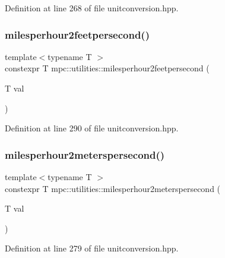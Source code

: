 Definition at line 268 of file unitconversion.\+hpp.

\mbox{\label{namespacempc_1_1utilities_aeca95aa677140f98a53ae3b5033ea892}} 
\subsubsection{\texorpdfstring{milesperhour2feetpersecond()}{milesperhour2feetpersecond()}}
{\footnotesize\ttfamily template$<$typename T $>$ \\
constexpr T mpc\+::utilities\+::milesperhour2feetpersecond (\begin{DoxyParamCaption}\item[{T}]{val }\end{DoxyParamCaption})}



Definition at line 290 of file unitconversion.\+hpp.

\mbox{\label{namespacempc_1_1utilities_ab14e5cdfd57941629a121328c7971cc3}} 
\subsubsection{\texorpdfstring{milesperhour2meterspersecond()}{milesperhour2meterspersecond()}}
{\footnotesize\ttfamily template$<$typename T $>$ \\
constexpr T mpc\+::utilities\+::milesperhour2meterspersecond (\begin{DoxyParamCaption}\item[{T}]{val }\end{DoxyParamCaption})}



Definition at line 279 of file unitconversion.\+hpp.

\mbox{\label{namespacempc_1_1utilities_acc0a66ea58c515cc13d5a0a79439c639}} 
